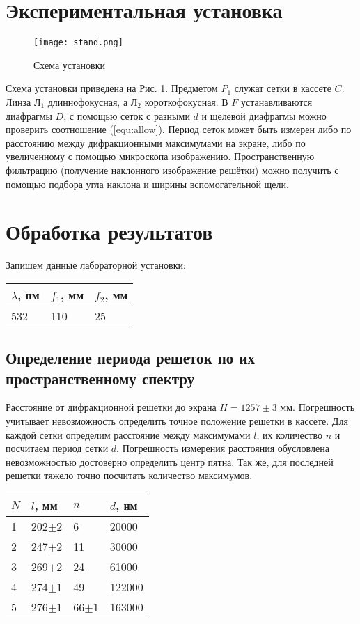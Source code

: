 \section{Экспериментальная установка}
\begin{figure}[h]
	\centering
	\texttt{[image: stand.png]}
	\caption{Схема установки}
	\label{fig:stand}
\end{figure}
Схема установки приведена на Рис. \ref{fig:stand}. Предметом $P_1$ служат сетки в кассете $C$. Линза $\text{Л}_1$ длиннофокусная, а $\text{Л}_2$ короткофокусная. В $F$ устанавливаются диафрагмы $D$, с помощью сеток с разными $d$ и щелевой диафрагмы можно проверить соотношение (\ref{equ:allow}). Период сеток может быть измерен либо по расстоянию между дифракционными максимумами на экране, либо по увеличенному с помощью микроскопа изображению. Пространственную фильтрацию (получение наклонного изображение решётки) можно получить с помощью подбора угла наклона и ширины вспомогательной щели.

\section{Обработка результатов}

	Запишем данные лабораторной установки:
	\begin{table}[H]
		\centering
		\begin{tabular}{|l|l|l|}
			\hline
			$\lambda$, нм & $f_1$, мм & $f_2$, мм \\ \hline
			532           & 110       & 25        \\ \hline
		\end{tabular}
	\end{table}

	\subsection{Определение периода решеток по их пространственному спектру}
	Расстояние от дифракционной решетки до экрана $H = 1257 \pm 3$ мм. Погрешность учитывает невозможность определить точное положение решетки в кассете. Для каждой сетки определим расстояние между максимумами $l$, их количество $n$ и посчитаем период сетки $d$. Погрешность измерения расстояния обусловлена невозможностью достоверно определить центр пятна. Так же, для последней решетки тяжело точно посчитать количество максимумов.
	
	\begin{table}[H]
		\centering
		\begin{tabular}{|l|l|l|l|}
			\hline
			$N$ & $l$, мм    & $n$       & $d$, нм \\ \hline
			1   & 202$\pm 2$ & 6         & 20000   \\ \hline
			2   & 247$\pm 2$ & 11        & 30000   \\ \hline
			3   & 269$\pm 2$ & 24        & 61000   \\ \hline
			4   & 274$\pm 1$ & 49        & 122000  \\ \hline
			5   & 276$\pm 1$ & 66$\pm 1$ & 163000  \\ \hline
		\end{tabular}
	\end{table}

